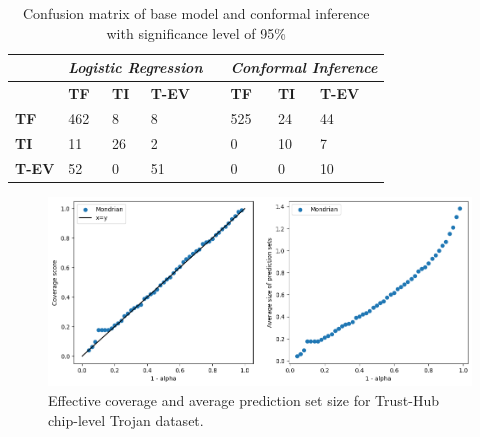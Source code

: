 \begin{table}[]
\caption{Confusion matrix of base model and conformal inference with significance level of 95\%}
\centering
\begin{tabular}{llllllll}
\hline
              & \multicolumn{3}{l}{\textit{\textbf{Logistic Regression}}} &  & \multicolumn{3}{l}{\textit{\textbf{Conformal Inference}}} \\ \hline
              & \textbf{TF}       & \textbf{TI}      & \textbf{T-EV}      &  & \textbf{TF}       & \textbf{TI}      & \textbf{T-EV}      \\ \hline
\textbf{TF}   & 462               & 8                & 8                  &  & 525               & 24               & 44                 \\ \hline
\textbf{TI}   & 11                & 26               & 2                  &  & 0                 & 10               & 7                  \\ \hline
\textbf{T-EV} & 52                & 0                & 51                 &  & 0                 & 0                & 10                 \\ \hline
\end{tabular}
\label{tab:basecm}
\end{table}



\begin{figure}[ht]
  \includegraphics[width=1\linewidth]{figs/cp/cp_score_coverage_and_prediction_Set.png}
  \caption{Effective coverage and average prediction set size for Trust-Hub chip-level Trojan dataset.}
  \label{fig:split}
\end{figure}

